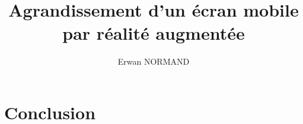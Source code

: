 \documentclass[letterpaper, twoside, 12pt,%
  memoire, francais, creativecommons, hyperref, withAlgo2e%
]{thETS}
\title{Agrandissement d'un écran mobile par réalité augmentée}
\author{Erwan NORMAND}
\begin{document}

\maketitle
\presentjury

\begin{avantpropos}
  
\end{avantpropos}

\begin{remerciements}
  
\end{remerciements}



\tableofcontents
\listoftables
\listoffigures

\begin{listofabbr}[3cm]
  
\end{listofabbr}

\cleardoublepage
{}
\reversemarginpar

\begin{introduction}
  
\end{introduction}







\chapter*{Conclusion}


\appendix
\multiannexe



\newpage
\begin{spacing}{1}
  \nocite{*}
  
  
\end{spacing}
\end{document}
